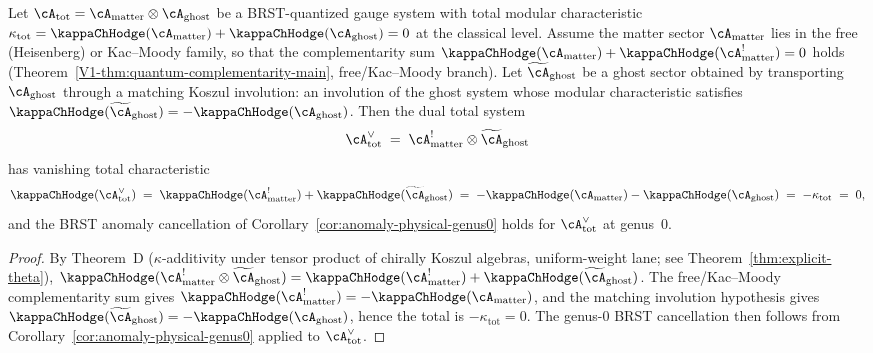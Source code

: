 \begin{proposition}
\label{prop:koszul-brst-anomaly-preservation}
Let $\cA_{\mathrm{tot}} = \cA_{\mathrm{matter}} \otimes \cA_{\mathrm{ghost}}$
be a BRST-quantized gauge system with total modular characteristic
$\kappa_{\mathrm{tot}} = \kappaChHodge(\cA_{\mathrm{matter}}) +
\kappaChHodge(\cA_{\mathrm{ghost}}) = 0$ at the classical level. Assume the matter
sector $\cA_{\mathrm{matter}}$ lies in the free (Heisenberg) or Kac--Moody
family, so that the complementarity sum $\kappaChHodge(\cA_{\mathrm{matter}})
+ \kappaChHodge(\cA_{\mathrm{matter}}^!) = 0$ holds
\textup{(}Theorem~\ref{V1-thm:quantum-complementarity-main}, free\slash Kac--Moody
branch\textup{)}. Let $\widetilde{\cA}_{\mathrm{ghost}}$ be a ghost sector
obtained by transporting $\cA_{\mathrm{ghost}}$ through a matching
Koszul involution: an involution of the ghost system whose modular
characteristic satisfies
$\kappaChHodge(\widetilde{\cA}_{\mathrm{ghost}}) = -\kappaChHodge(\cA_{\mathrm{ghost}})$.
Then the dual total system
\[
 \cA_{\mathrm{tot}}^{\vee}
 \;=\; \cA_{\mathrm{matter}}^! \otimes \widetilde{\cA}_{\mathrm{ghost}}
\]
has vanishing total characteristic
\[
 \kappaChHodge(\cA_{\mathrm{tot}}^{\vee})
 \;=\; \kappaChHodge(\cA_{\mathrm{matter}}^!)
 + \kappaChHodge(\widetilde{\cA}_{\mathrm{ghost}})
 \;=\; -\kappaChHodge(\cA_{\mathrm{matter}})
 - \kappaChHodge(\cA_{\mathrm{ghost}})
 \;=\; -\kappa_{\mathrm{tot}}
 \;=\; 0,
\]
and the BRST anomaly cancellation of
Corollary~\textup{\ref{cor:anomaly-physical-genus0}} holds for
$\cA_{\mathrm{tot}}^{\vee}$ at genus~$0$.
\end{proposition}

\begin{proof}
By Theorem~D \textup{(}$\kappa$-additivity under tensor product of chirally
Koszul algebras, uniform-weight lane; see
Theorem~\ref{thm:explicit-theta}\textup{)},
$\kappaChHodge(\cA_{\mathrm{matter}}^! \otimes \widetilde{\cA}_{\mathrm{ghost}})
= \kappaChHodge(\cA_{\mathrm{matter}}^!) + \kappaChHodge(\widetilde{\cA}_{\mathrm{ghost}})$.
The free\slash Kac--Moody complementarity sum gives
$\kappaChHodge(\cA_{\mathrm{matter}}^!) = -\kappaChHodge(\cA_{\mathrm{matter}})$,
and the matching involution hypothesis gives
$\kappaChHodge(\widetilde{\cA}_{\mathrm{ghost}})
= -\kappaChHodge(\cA_{\mathrm{ghost}})$, hence the total is
$-\kappa_{\mathrm{tot}} = 0$. The genus-$0$ BRST cancellation then
follows from Corollary~\ref{cor:anomaly-physical-genus0} applied to
$\cA_{\mathrm{tot}}^{\vee}$.
\end{proof}

